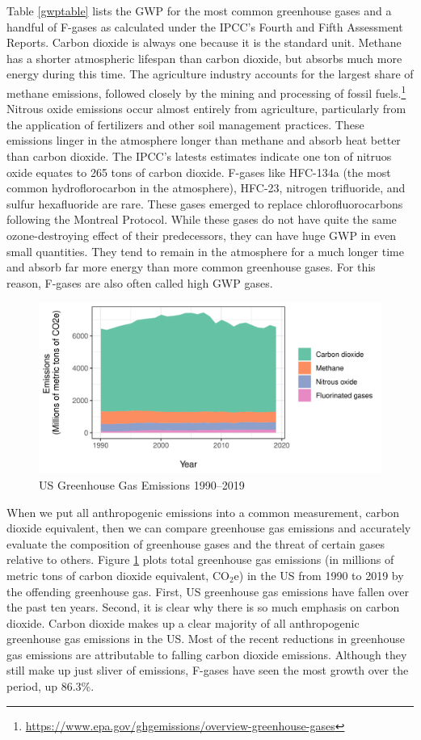 Table \ref{gwptable} lists the GWP for the most common greenhouse gases and a handful of F-gases as calculated under the IPCC's Fourth and Fifth Assessment Reports. Carbon dioxide is always one because it is the standard unit. Methane has a shorter atmospheric lifespan than carbon dioxide, but absorbs much more energy during this time. The agriculture industry accounts for the largest share of methane emissions, followed closely by the mining and processing of fossil fuels.\footnote{\url{https://www.epa.gov/ghgemissions/overview-greenhouse-gases}} Nitrous oxide emissions occur almost entirely from agriculture, particularly from the application of fertilizers and other soil management practices. These emissions linger in the atmosphere longer than methane and absorb heat better than carbon dioxide. The IPCC's  latests estimates indicate one ton of nitruos oxide equates to 265 tons of carbon dioxide. F-gases like HFC-134a (the most common hydroflorocarbon in the atmosphere), HFC-23, nitrogen trifluoride, and sulfur hexafluoride are rare. These gases emerged to replace chlorofluorocarbons following the Montreal Protocol. While these gases do not have quite the same ozone-destroying effect of their predecessors, they can have huge GWP in even small quantities. They tend to remain in the atmosphere for a much longer time and absorb far more energy than more common greenhouse gases. For this reason, F-gases are also often called high GWP gases.

\begin{figure}
\caption{US Greenhouse Gas Emissions 1990--2019\label{ghg1}}
\centering
\includegraphics[scale=1]{figures/chapter1_figures/ghg_stacked.png}
\end{figure}

When we put all anthropogenic emissions into a common measurement, carbon dioxide equivalent, then we can compare greenhouse gas emissions and accurately evaluate the composition of greenhouse gases and the threat of certain gases relative to others. Figure \ref{ghg1} plots total greenhouse gas emissions (in millions of metric tons of carbon dioxide equivalent, CO$_2$e) in the US from 1990 to 2019 by the offending greenhouse gas. First, US greenhouse gas emissions have fallen over the past ten years. Second, it is clear why there is so much emphasis on carbon dioxide. Carbon dioxide makes up a clear majority of all anthropogenic greenhouse gas emissions in the US. Most of the recent reductions in greenhouse gas emissions are attributable to falling carbon dioxide emissions. Although they still make up just sliver of emissions, F-gases have seen the most growth over the period, up 86.3\%. 

